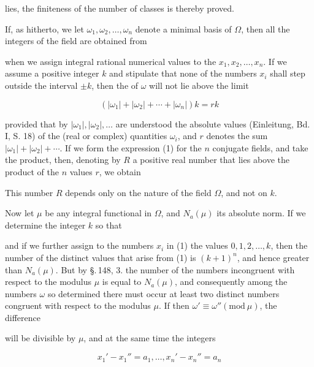 lies, the finiteness of the number of classes is thereby proved.

If, as hitherto, we let $\omega_1, \omega_2, \ldots, \omega_n$ denote a minimal basis of $\Omega$, then all the integers of the field are obtained from


when we assign integral rational numerical values to the $x_1, x_2, \ldots, x_n$. If we assume a positive integer $k$ and stipulate that none of the numbers $x_i$ shall step outside the interval $\pm k$, then the  of $\omega$ will not lie above the limit

\[
(|\omega_1| + |\omega_2| + \cdots + |\omega_n|) k = rk
\]

provided that by $|\omega_1|, |\omega_2|, \ldots$ are understood the absolute values (Einleitung, Bd. I, S. 18) of the (real or complex) quantities $\omega_i$, and $r$ denotes the sum $|\omega_1| + |\omega_2| + \cdots$. If we form the expression (1) for the $n$ conjugate fields, and take the product, then, denoting by $R$ a positive real number that lies above the product of the $n$ values $r$, we obtain


This number $R$ depends only on the nature of the field $\Omega$, and not on $k$.

Now let $\mu$ be any integral functional in $\Omega$, and $N_a(\mu)$ its absolute norm. If we determine the integer $k$ so that


and if we further assign to the numbers $x_i$ in (1) the values $0, 1, 2, \ldots, k$, then the number of the distinct values that arise from (1) is $(k+1)^n$, and hence greater than $N_a(\mu)$. But by \S.\,148, 3. the number of the numbers incongruent with respect to the modulus $\mu$ is equal to $N_a(\mu)$, and consequently among the numbers $\omega$ so determined there must occur at least two distinct numbers congruent with respect to the modulus $\mu$. If then $\omega' \equiv \omega'' (\mathrm{mod}\ \mu)$, the difference


will be divisible by $\mu$, and at the same time the integers

\[
x_1' - x_1'' = a_1, \ldots, x_n' - x_n'' = a_n
\]

